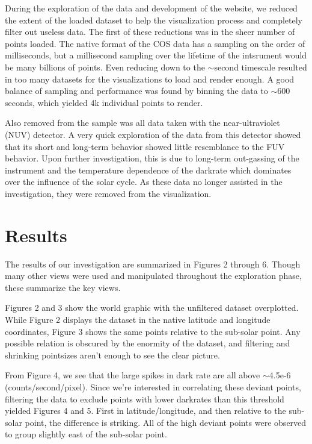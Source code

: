 \documentclass[a4paper,11pt]{article}
\begin{document}
During the exploration of the data and development of the website, we reduced the extent of the loaded dataset
to help the visualization process and completely filter out useless data.  The first of these reductions was in the 
sheer number of points loaded.  The native format of the COS data has a sampling on the order of milliseconds, 
but a millisecond sampling over the lifetime of the intsrument would be many billions of points.  Even reducing down 
to the $\sim$second timescale resulted in too many datasets for the visualizations to load and render 
enough.  A good balance of sampling and performance was found by binning the data to $\sim$600 seconds,
which yielded 4k individual points to render. 

Also removed from the sample was all data taken with the near-ultraviolet (NUV) detector.  A very quick exploration of the data from this detector
showed that its short and long-term behavior showed little resemblance to the FUV behavior.  Upon further 
investigation, this is due to long-term out-gassing of the instrument and the temperature
dependence of the darkrate which dominates over the influence of the solar cycle.  As these data no longer assisted 
in the investigation, they were removed from the visualization.

\section{Results}
The results of our investigation are summarized in Figures 2 through 6.  Though many other views were used 
and manipulated throughout the exploration phase, these summarize the key views.

Figures 2 and 3 show the world graphic with the unfiltered dataset overplotted.  While Figure 2 displays the
dataset in the native latitude and longitude coordinates, Figure 3 shows the same points relative to the 
sub-solar point.  Any possible relation is obscured by the enormity of the dataset, and filtering and shrinking
pointsizes aren't enough to see the clear picture. 

From Figure 4, we see that the large spikes in dark rate are all above $\sim$4.5e-6 (counts/second/pixel).  
Since we're interested in correlating these deviant points, filtering the data to exclude points with lower 
darkrates than this threshold yielded Figures 4 and 5.  First in latitude/longitude, and then relative to the
sub-solar point, the difference is striking.  All of the high deviant points were observed to group slightly east of the sub-solar
point.  
\end{document}

